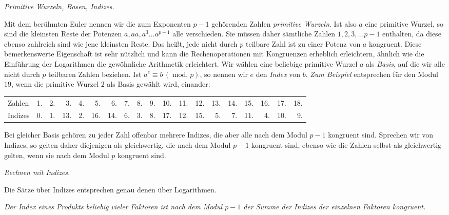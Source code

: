 \begin{center}\emph{Primitive Wurzeln, Basen, Indizes.}\end{center}

Mit dem berühmten Euler nennen wir die zum Exponenten $p-1$ gehörenden Zahlen \emph{primitive Wurzeln}. Ist also $a$ eine primitive Wurzel, so sind die kleinsten Reste der Potenzen $a,aa,a^3\ldots a^{p-1}$
alle verschieden. Sie müssen daher sämtliche Zahlen $1,2,3,\ldots p-1$ enthalten, da diese ebenso zahlreich sind wie jene kleinsten Reste. Das heißt, jede nicht durch $p$ teilbare Zahl ist zu einer Potenz von $a$ kongruent. Diese bemerkenswerte Eigenschaft ist sehr nützlich und kann die Rechenoperationen mit Kongruenzen erheblich erleichtern, ähnlich wie die Einführung der Logarithmen die gewöhnliche Arithmetik erleichtert. Wir wählen eine beliebige primitive Wurzel $a$ als \emph{Basis}, auf die wir alle nicht durch $p$ teilbaren Zahlen beziehen. Ist $a^e\equiv b\,(\operatorname{mod.}p)$, so nennen wir $e$ den \emph{Index} von $b$. \emph{Zum Beispiel} entsprechen für den Modul $19$, wenn die primitive Wurzel $2$ als Basis gewählt wird, einander:

\begin{center}
\begingroup\small\setlength{\tabcolsep}{1.5pt}
\begin{tabular}{@{}l@{\quad}*{18}{r}@{}}
Zahlen & 1. & 2. & 3. & 4. & 5. & 6. & 7. & 8. & 9. & 10. & 11. & 12. & 13. & 14. & 15. & 16. & 17. & 18.\\
Indizes & 0. & 1. & 13. & 2. & 16. & 14. & 6. & 3. & 8. & 17. & 12. & 15. & 5. & 7. & 11. & 4. & 10. & 9.
\end{tabular}
\endgroup
\end{center}

Bei gleicher Basis gehören zu jeder Zahl offenbar mehrere Indizes, die aber alle nach dem Modul $p-1$ kongruent sind. Sprechen wir von Indizes, so gelten daher diejenigen als gleichwertig, die nach dem Modul $p-1$ kongruent sind, ebenso wie die Zahlen selbst als gleichwertig gelten, wenn sie nach dem Modul $p$ kongruent sind.

\begin{center}\emph{Rechnen mit Indizes.}\end{center}

Die Sätze über Indizes entsprechen genau denen über Logarithmen.

\emph{Der Index eines Produkts beliebig vieler Faktoren ist nach dem Modul $p-1$ der Summe der Indizes der einzelnen Faktoren kongruent.}

